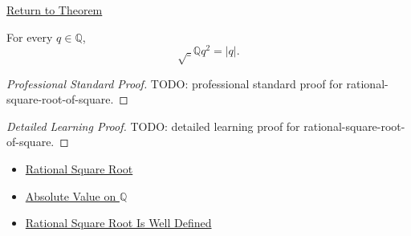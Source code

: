 \newpage
{}
\label{prf:rational-square-root-of-square}

\begin{remark*}[Return]
\hyperref[thm:rational-square-root-of-square]{Return to Theorem}
\end{remark*}

\begin{theorem*}
For every $q\in\mathbb{Q}$,
\[
\sqrt_{\mathbb{Q}}{q^2}=|q|.
\]
\end{theorem*}

\begin{proof}[Professional Standard Proof]
\LRAProofBodyStart
TODO: professional standard proof for rational-square-root-of-square.
\end{proof}

\begin{proof}[Detailed Learning Proof]
\LRAProofBodyStart
TODO: detailed learning proof for rational-square-root-of-square.
\end{proof}

\begin{remark*}
\end{remark*}

\begin{dependencies}
\begin{itemize}
  \item \hyperref[def:rational-square-root]{Rational Square Root}
  \item \hyperref[def:absolute-value-on-q]{Absolute Value on $\mathbb{Q}$}
  \item \hyperref[thm:rational-square-root-well-defined]{Rational Square Root Is Well Defined}
\end{itemize}
\end{dependencies}

\clearpage
